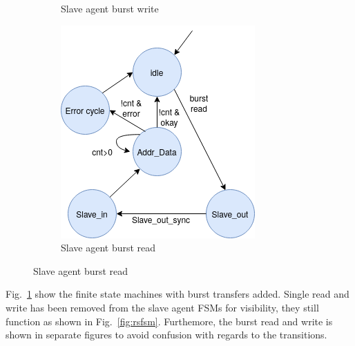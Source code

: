 \begin{figure}[hbt]
\begin{subfigure}[b]{0.3\linewidth}
 \caption{Slave agent burst write}
 \end{subfigure}
 \begin{subfigure}[b]{0.3\linewidth}
 \includegraphics[width=\linewidth]{figs/hw/sAgent_rburstfsm.png}
 \caption{Slave agent burst read}
 \end{subfigure}
\label{fig:burst-fsm}
\end{figure}

Fig.~\ref{fig:burst-fsm} show the finite state machines with burst transfers added. Single read and write has been removed from the slave agent FSMs for visibility, they still function as shown in Fig.~\ref{fig:rsfsm}. Furthemore, the burst read and write is shown in separate figures to avoid confusion with regards to the transitions. 

